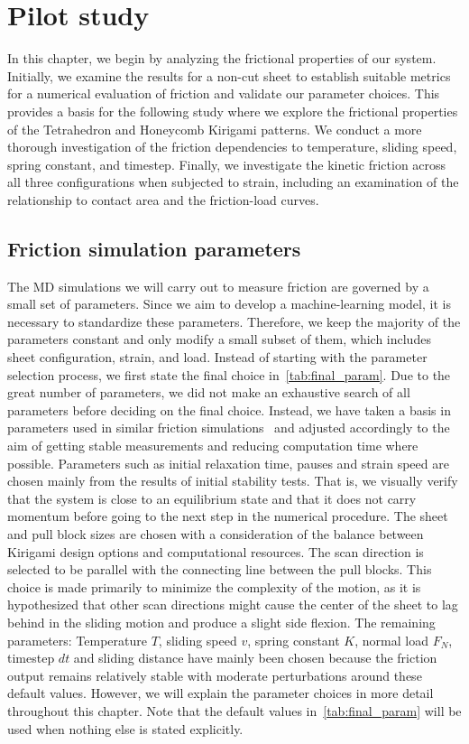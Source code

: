 \chapter{Pilot study}\label{chap:pilot_study}
In this chapter, we begin by analyzing the frictional properties of our system. Initially, we examine the results for a non-cut sheet to establish suitable metrics for a numerical evaluation of friction and validate our parameter choices. This provides a basis for the following study where we explore the frictional properties of the Tetrahedron and Honeycomb Kirigami patterns. We conduct a more thorough investigation of the friction dependencies to temperature, sliding speed, spring constant, and timestep. Finally, we investigate the kinetic friction across all three configurations when subjected to strain, including an examination of the relationship to contact area and the friction-load curves.


\section{Friction simulation parameters}
The \acrshort{MD} simulations we will carry out to measure friction are governed
by a small set of parameters. Since we aim to develop a machine-learning model,
it is necessary to standardize these parameters. Therefore, we keep the majority
of the parameters constant and only modify a small subset of them, which
includes sheet configuration, strain, and load. Instead of starting with the
parameter selection process, we first state the final choice
in~\cref{tab:final_param}. Due to the great number of parameters, we did not
make an exhaustive search of all parameters before deciding on the final choice.
Instead, we have taken a basis in parameters used in similar friction
simulations~\cite{li_evolving_2016, Yoon2015MolecularDS, liu_high-speed_2014,
zhu_study_2018, ma12091425} and adjusted accordingly to the aim of getting
stable measurements and reducing computation time where possible. Parameters
such as initial relaxation time, pauses and strain speed are chosen mainly from
the results of initial stability tests. That is, we visually verify that the
system is close to an equilibrium state and that it does not carry momentum
before going to the next step in the numerical procedure. The sheet and pull
block sizes are chosen with a consideration of the balance between Kirigami
design options and computational resources. The scan direction is selected to be
parallel with the connecting line between the pull blocks. This choice is made
primarily to minimize the complexity of the motion, as it is hypothesized that
other scan directions might cause the center of the sheet to lag behind in the sliding motion and
produce a slight side flexion. The remaining
parameters: Temperature $T$, sliding speed $v$, spring constant
$K$, normal load $F_N$, timestep $dt$ and sliding distance have mainly been chosen
because the friction output remains relatively stable with moderate
perturbations around these default values. However, we will explain the parameter choices in more detail throughout this chapter. Note that the default values in~\cref{tab:final_param}
will be used when nothing else is stated explicitly.


